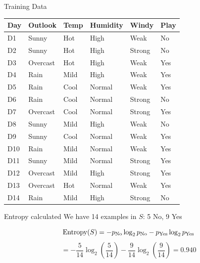 \documentclass[usenames,dvipsnames]{beamer}
\begin{document}
	\begin{frame}{Training Data}
\begin{tabular}{lllll||l} \toprule
	\textbf{Day} & \textbf{Outlook}  & \textbf{Temp} & \textbf{Humidity} & \textbf{Windy}  & \textbf{Play} \\ \midrule
	D1  & Sunny    & Hot  & High     & Weak   & No   \\
	D2  & Sunny    & Hot  & High     & Strong & No   \\
	D3  & Overcast & Hot  & High     & Weak   & Yes  \\
	D4  & Rain     & Mild & High     & Weak   & Yes  \\
	D5  & Rain     & Cool & Normal   & Weak   & Yes  \\
	D6  & Rain     & Cool & Normal   & Strong & No   \\
	D7  & Overcast & Cool & Normal   & Strong & Yes  \\
	D8  & Sunny    & Mild & High     & Weak   & No   \\
	D9  & Sunny    & Cool & Normal   & Weak   & Yes  \\
	D10 & Rain     & Mild & Normal   & Weak   & Yes  \\
	D11 & Sunny    & Mild & Normal   & Strong & Yes  \\
	D12 & Overcast & Mild & High     & Strong & Yes  \\
	D13 & Overcast & Hot  & Normal   & Weak   & Yes  \\
	D14 & Rain     & Mild & High     & Strong & No  \\ \bottomrule
\end{tabular}
\end{frame}


\begin{frame}{Entropy calculated}
We have 14 examples in $S$: 5 No, 9 Yes

$$\operatorname{Entropy}(S) = -p_{\text{No}} \log_2 p_{\text{No}} - p_{\text{Yes}} \log_2 p_{\text{Yes}}$$
$$
= -\frac{5}{14} \log_2\left(\frac{5}{14}\right) - \frac{9}{14} \log_2\left(\frac{9}{14}\right) = 0.940
$$
\end{frame}
\end{document}

